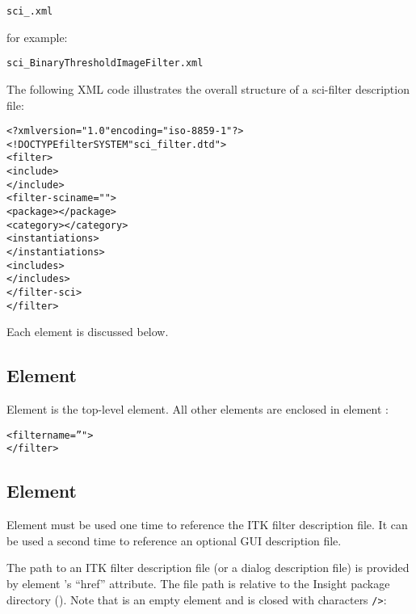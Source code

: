 \begin{alltt}
  sci\_.xml
\end{alltt}

for example:

\begin{alltt}
  sci\_BinaryThresholdImageFilter.xml
\end{alltt}


The following XML code illustrates the overall structure of a
sci-filter description file:

\begin{alltt}
  <?xml version="1.0" encoding="iso-8859-1"?>
  <!DOCTYPE filter SYSTEM "sci_filter.dtd">
  <filter>
    <include>
    \velide
    </include>
    <filter-sci name="">
      <package></package>
      <category></category>
      <instantiations>
      \velide
      </instantiations>
      <includes>
      \velide
      </includes>
    </filter-sci>
  </filter>
\end{alltt}

Each element is discussed below.


\subsection{Element }

Element  is the top-level element.  All other
elements are enclosed in element :

\begin{alltt}
  <filter name=''">
  \velide
  </filter>
\end{alltt}

\subsection{Element }

Element  must be used one time to reference the
ITK filter description file.  It can be used a second time to
reference an optional GUI description file.

The path to an ITK filter description file (or a dialog description
file) is provided by element 's ``href''
attribute.  The file path is relative to the  \sr{} Insight
package directory ().  Note that
 is an empty element and is closed with
characters \verb|/>|:

